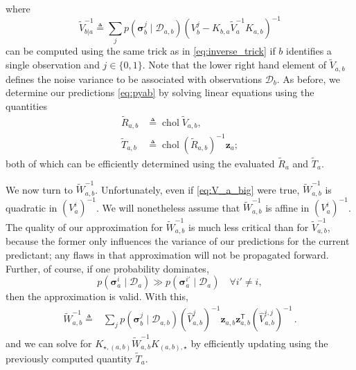 \documentclass{article}
\newcommand{\given}{\ensuremath{\mid}}
\newcommand{\cm}[1]{\ensuremath{\mathcal{#1}}}
\newcommand{\bm}[1]{\ensuremath{\mathbf{#1}}}
\newcommand{\data}{\ensuremath{\cm{D}}}
\newcommand{\vect}[1]{\bm{#1}}
\newcommand{\vz}{\vect{z}}
\newcommand{\vs}{\vect{\sigma}}
\newcommand{\fPr}{p}
\newcommand{\Prob}[2]{\fPr(#1 \given #2 )}
\newcommand{\tr}{\ensuremath{\mathsf{T}}}
\newcommand{\defequal}{\triangleq}
\DeclareMathOperator{\chol}{chol}
\begin{document}
where
\begin{equation*}
 \tilde{V}^{-1}_{b|a} \defequal \sum_j \Prob{\vs^j_{b}}{\data_{a,b}} (V^j_b -K_{b,a} \tilde{V}_a^{-1}K_{a,b})^{-1}
\end{equation*}
can be computed using the same trick as in \eqref{eq:inverse_trick} if
$b$ identifies a single observation and $j\in\{0,1\}$. Note that the
lower right hand element of $\tilde{V}_{a,b}$ defines the noise
variance to be associated with observations $\data_b$. As before, we
determine our predictions \eqref{eq:pyab} by solving linear equations
using the quantities
\begin{align}
 \tilde{R}_{a,b} & \defequal \chol \tilde{V}_{a,b} \label{eq:Rab}, \\
 \tilde{T}_{a,b} & \defequal \chol (\tilde{R}_{a,b})^{-1} \vz_a \label{eq:Tab};
\end{align}
both of which can be efficiently determined \citep[Appendix
  B]{osbornebayesian} using the evaluated $\tilde{R}_a$ and
$\tilde{T}_a$.

We now turn to $\tilde{W}_{a,b}^{-1}$. Unfortunately, even if
\eqref{eq:V_a_big} were true, $\tilde{W}_{a,b}^{-1}$ is quadratic in
$(V^i_a)^{-1}$. We will nonetheless assume that $\tilde{W}_{a,b}^{-1}$
is affine in $(V^i_a)^{-1}$. The quality of our approximation for
$\tilde{W}_{a,b}^{-1}$ is much less critical than for
$\tilde{V}^{-1}_{a,b}$, because the former only influences the
variance of our predictions for the current predictant; any flaws in
that approximation will not be propagated forward. Further, of course,
if one probability dominates, 
\begin{equation*}
\Prob{\vs^i_{a}}{\data_{a}}\gg
\Prob{\vs^{i'}_{a}}{\data_{a}} \quad \forall i' \neq i,
\end{equation*} 
then the approximation is valid. With this,
\begin{align}
\tilde{W}^{-1}_{a,b} \defequal
& \sum_{j} \Prob{\vs^j_{b}}{\data_{a,b}} (\hat{V}_{a,b}^{j})^{-1}\vz_{a,b}^{\phantom{\tr}} \vz_{a,b}^\tr (\hat{V}_{a,b}^{i,j})^{-1}\,.\label{eq:Wab}
\end{align}
and we can solve for
$K_{\star,(a,b)}\tilde{W}^{-1}_{a,b}K_{(a,b),\star}$ by efficiently
updating using the previously computed quantity $\tilde{T}_{a}$.
\end{document}

